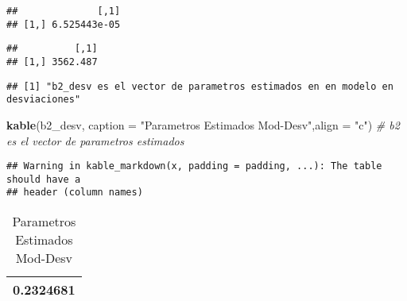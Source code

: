 \documentclass[
]{article}
\newenvironment{Shaded}{\begin{snugshade}}{\end{snugshade}}
\newcommand{\CommentTok}[1]{\textcolor[rgb]{0.56,0.35,0.01}{\textit{#1}}}
\newcommand{\DataTypeTok}[1]{\textcolor[rgb]{0.13,0.29,0.53}{#1}}
\newcommand{\DecValTok}[1]{\textcolor[rgb]{0.00,0.00,0.81}{#1}}
\newcommand{\KeywordTok}[1]{\textcolor[rgb]{0.13,0.29,0.53}{\textbf{#1}}}
\newcommand{\NormalTok}[1]{#1}
\newcommand{\OperatorTok}[1]{\textcolor[rgb]{0.81,0.36,0.00}{\textbf{#1}}}
\newcommand{\StringTok}[1]{\textcolor[rgb]{0.31,0.60,0.02}{#1}}
\begin{document}
\begin{verbatim}
##              [,1]
## [1,] 6.525443e-05
\end{verbatim}

\begin{Shaded}
\end{Shaded}

\begin{verbatim}
##          [,1]
## [1,] 3562.487
\end{verbatim}

\begin{Shaded}
\end{Shaded}

\begin{verbatim}
## [1] "b2_desv es el vector de parametros estimados en en modelo en desviaciones"
\end{verbatim}

\begin{Shaded}
\begin{Highlighting}[]
\KeywordTok{kable}\NormalTok{(b2_desv, }\DataTypeTok{caption =} \StringTok{"Parametros Estimados Mod-Desv"}\NormalTok{,}\DataTypeTok{align =} \StringTok{"c"}\NormalTok{)      }\CommentTok{# b2 es el vector de parametros estimados }
\end{Highlighting}
\end{Shaded}

\begin{verbatim}
## Warning in kable_markdown(x, padding = padding, ...): The table should have a
## header (column names)
\end{verbatim}

\begin{longtable}[]{@{}c@{}}
\caption{Parametros Estimados Mod-Desv}\tabularnewline
\toprule
\endhead
0.2324681\tabularnewline
\bottomrule
\end{longtable}
\end{document}
